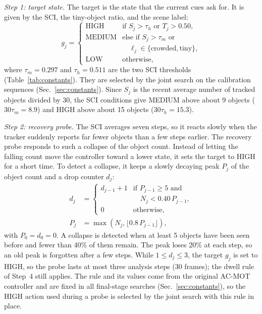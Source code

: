 \documentclass[journal]{new-aiaa}
\begin{document}
\emph{Step 1: target state.} The target is the state that the current cues
ask for. It is given by the SCI, the tiny-object ratio, and the scene label:
\begin{equation}
g_j=\begin{cases}
\text{HIGH}   & \text{if } S_j>\tau_h \text{ or } T_j>0.50,\\
\text{MEDIUM} & \text{else if } S_j>\tau_m \text{ or}\\
              & \quad \ell_j\in\{\text{crowded},\text{tiny}\},\\
\text{LOW}    & \text{otherwise,}
\end{cases}
\label{eq:target}
\end{equation}
where $\tau_m=0.297$ and $\tau_h=0.511$ are the two SCI thresholds
(Table~\ref{tab:constants}). They are selected by the joint search
on the calibration sequences (Sec.~\ref{sec:constants}). Since $S_j$ is the
recent average number of tracked objects divided by 30, the SCI conditions
give MEDIUM above about 9 objects ($30\tau_m=8.9$) and HIGH above about 15
objects ($30\tau_h=15.3$).

\emph{Step 2: recovery probe.} The SCI averages seven steps, so it reacts
slowly when the tracker suddenly reports far fewer objects than a few steps
earlier. The recovery probe responds to such a collapse of the object count.
Instead of letting the falling count move the controller toward a lower
state, it sets the target to HIGH for a short time. To detect a collapse, it
keeps a slowly decaying peak $P_j$ of the object count and a drop counter
$d_j$:
\begin{align}
d_j&=\begin{cases}
d_{j-1}+1 & \text{if } P_{j-1}\ge5 \text{ and}\\
          & \quad N_j<0.40\,P_{j-1},\\
0         & \text{otherwise,}
\end{cases}\label{eq:drop}\\
P_j&=\max\left(N_j,\lfloor 0.8\,P_{j-1}\rfloor\right),\label{eq:peak}
\end{align}
with $P_0=d_0=0$. A collapse is detected when at least 5 objects have been seen
before and fewer than 40\% of them remain. The peak loses 20\% at each step,
so an old peak is forgotten after a few steps. While $1\le d_j\le3$, the
target $g_j$ is set to HIGH, so the probe lasts at most three analysis steps
(30 frames); the dwell rule of Step~4 still applies. The rule and its values
come from the original AC-MOT controller and are fixed in all final-stage
searches (Sec.~\ref{sec:constants}), so the HIGH action used during a probe
is selected by the joint search with this rule in place.
\end{document}
